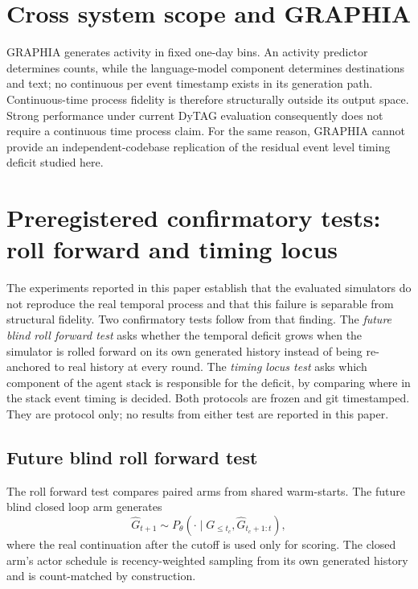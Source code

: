 








\section{Cross system scope and GRAPHIA}
\label{app:graphia}

GRAPHIA generates activity in fixed one-day bins. An activity predictor
determines counts, while the language-model component determines destinations
and text; no continuous per event timestamp exists in its generation path.
Continuous-time process fidelity is therefore structurally outside its output
space. Strong performance under current DyTAG evaluation consequently does not
require a continuous time process claim. For the same reason, GRAPHIA cannot
provide an independent-codebase replication of the residual event level timing
deficit studied here.


\section{Preregistered confirmatory tests: roll forward and timing locus}
\label{app:followups}

The experiments reported in this paper establish that the evaluated simulators
do not reproduce the real temporal process and that this failure is separable
from structural fidelity. Two confirmatory tests follow from that finding. The
\emph{future blind roll forward test} asks whether the temporal deficit grows
when the simulator is rolled forward on its own generated history instead of
being re-anchored to real history at every round. The \emph{timing locus test}
asks which component of the agent stack is responsible for the deficit, by
comparing where in the stack event timing is decided. Both protocols are frozen
and git timestamped. They are protocol only; no results from either test are
reported in this paper.

\subsection{Future blind roll forward test}

The roll forward test compares paired arms from shared warm-starts. The future blind closed loop
arm generates
\[
\widehat{G}_{t+1}
\sim
P_\theta\!\left(
\cdot \mid
G_{\le t_c},
\widehat{G}_{t_c+1:t}
\right),
\]
where the real continuation after the cutoff is used only for scoring. The
closed arm's actor schedule is recency-weighted sampling from its own generated
history and is count-matched by construction.

